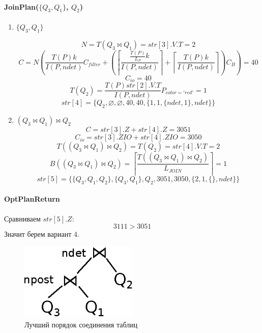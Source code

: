 \documentclass[russian,utf8,emptystyle]{eskdtext}
\begin{document}
\paragraph{JoinPlan($\{Q_3, Q_1\}$, $Q_2$)}

\begin{enumerate}[label=\arabic*.]
\item $\{Q_3, Q_1\}$

$$
N = T(Q_3 \bowtie Q_1) = str[3].V.T = 2
$$
$$
C = N\left(\frac{T(P)k}{I(P,ndet)}C_{filter} + \left( \left\lceil \frac{\frac{T(P)}{L_P} k}{I(P, ndet)} \right\rceil + \left\lceil \frac{T(P)k}{I(P,ndet)}\right\rceil \right)C_B\right) = 40
$$
$$
C_{io} = 40
$$
$$
T(Q_2) = \frac{T(P)str[2].V.T}{I(P,ndet)} P_{color='red'} = 1
$$
$$
str[4] = \{Q_2, \varnothing, \varnothing, 40, 40, \{ 1, 1, \{ ndet, 1\}, ndet\}\}
$$

\item $(Q_3 \bowtie Q_1) \bowtie Q_2$
$$
C = str[3].Z + str[4].Z = 3051
$$
$$
C_{io} = str[3].ZIO + str[4].ZIO = 3050
$$
$$
T((Q_3 \bowtie Q_1) \bowtie Q_2) = T(Q_2) = str[4].V.T=2
$$
$$
B((Q_3 \bowtie Q_1) \bowtie Q_2) = \left\lceil\frac{T((Q_3 \bowtie Q_1) \bowtie Q_2)}{L_{JOIN}}\right\rceil = 1
$$
$$
str[5] =  \{\{ Q_3, Q_1, Q_2\}, \{ Q_3, Q_1\}, Q_2, 3051, 3050, \{ 2, 1, \{ \}, ndet\}\}
$$
\end{enumerate}
 
\paragraph{OptPlanReturn}
Сравниваем $str[5].Z$:
$$
3111 > 3051
$$
Значит берем вариант 4.

\begin{figure}[h!]
\centering
\includegraphics[width=0.5\textwidth]{best_plan}
\caption{Лучший порядок соединения таблиц}
\label{fig:best_plan}
\end{figure}

\clearpage
\end{document}
